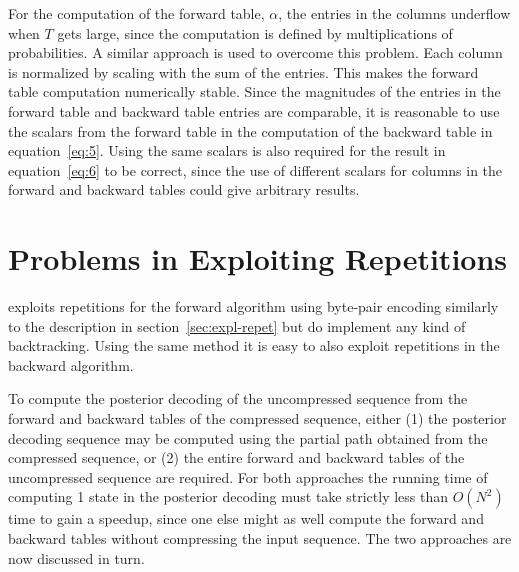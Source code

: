 For the computation of the forward table, $\alpha$, the entries in the columns underflow when
$T$ gets large, since the computation is defined by multiplications of
probabilities. A similar approach is used to overcome this problem. Each column
is normalized by scaling with the sum of the entries. This makes the forward
table computation numerically stable. Since the magnitudes of the entries in
the forward table and backward table entries are comparable, it is reasonable
to use the scalars from the forward table in the computation of the backward
table in equation~\eqref{eq:5}. Using the same scalars is also required for the
result in equation~\eqref{eq:6} to be correct, since the use of different
scalars for columns in the forward and backward tables could give arbitrary
results.



\section{Problems in Exploiting Repetitions}
\label{sec:probl-expl-repet}

\citet{sand2013ziphmmlib} exploits repetitions for the forward algorithm using
byte-pair encoding similarly to the description in
section~\ref{sec:expl-repet} but do implement any kind of backtracking. Using
the same method it is easy to also exploit repetitions in the backward
algorithm.

To compute the posterior decoding of the uncompressed sequence from the
forward and backward tables of the compressed sequence, either (1) the
posterior decoding sequence may be computed using the partial path obtained
from the compressed sequence, or (2) the entire forward and backward tables of
the uncompressed sequence are required. For both approaches the running time of
computing 1 state in the posterior decoding must take strictly less than
$O(N^2)$ time to gain a speedup, since one else might as well compute the
forward and backward tables without compressing the input sequence. The two
approaches are now discussed in turn.

